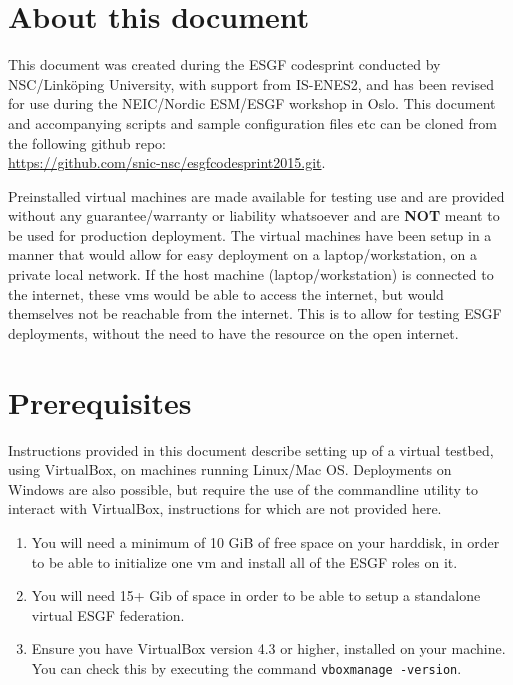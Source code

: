 \section {About this document}
This document was created during the ESGF codesprint conducted by NSC/Link\"oping University, with support from IS-ENES2, and has been revised for use during the NEIC/Nordic ESM/ESGF workshop in Oslo. 
This document and accompanying scripts and sample configuration files etc can be cloned from the following github repo:\\
\url{https://github.com/snic-nsc/esgfcodesprint2015.git}.
\par\vspace{2mm}\noindent
Preinstalled virtual machines are made available for testing use and are provided without any guarantee/warranty or liability whatsoever and are \textbf{NOT} meant to be used for production deployment.  The virtual machines have been setup in a manner that would allow for easy deployment on a laptop/workstation, on a private local network. If the host machine (laptop/workstation) is connected to the internet, these vms would be able to access the internet, but would themselves not be reachable from the internet. This is to allow for testing ESGF deployments, without the need to have the resource on the open internet.
\section{Prerequisites}
Instructions provided in this document describe setting up of a virtual testbed, using VirtualBox, on machines running Linux/Mac OS. Deployments on Windows are also possible, but require the use of the commandline utility to interact with VirtualBox, instructions for which are not provided here.
\begin{enumerate}
\item You will need a minimum of 10 GiB of free space on your harddisk, in order to be able to initialize one vm and install all of the ESGF roles on it.
\item You will need 15+ Gib of space in order to be able to setup a standalone virtual ESGF federation.
\item Ensure you have VirtualBox version 4.3 or higher, installed on your machine. You can check this by executing the command \texttt{vboxmanage -version}.
\end{enumerate}
